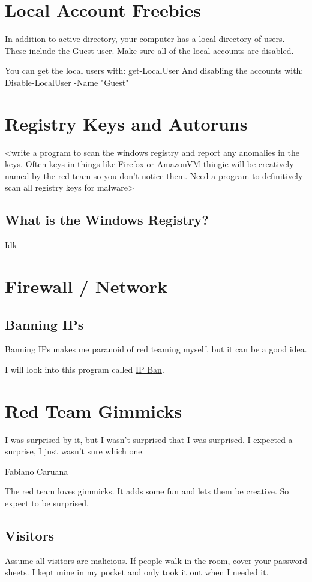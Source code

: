 \documentclass{article}
\begin{document}
\section{Local Account Freebies}
In addition to active directory, your computer has a local directory of users. These include the Guest user.
Make sure all of the local accounts are disabled.

You can get the local users with: get-LocalUser
And disabling the accounts with: Disable-LocalUser -Name "Guest"

\section{Registry Keys and Autoruns}
<write a program to scan the windows registry and report any anomalies in the keys.
Often keys in things like Firefox or AmazonVM thingie will be creatively named by the red team
so you don't notice them. Need a program to definitively scan all registry keys for malware>

\subsection{What is the Windows Registry?}
Idk

\section{Firewall / Network}

\subsection{Banning IPs}
Banning IPs makes me paranoid of red teaming myself, but it can be a good idea.

I will look into this program called \href{https://github.com/DigitalRuby/IPBan}{IP Ban}.

\section{Red Team Gimmicks}
\epigraph{I was surprised by it, but I wasn’t surprised that I was surprised. I expected a surprise, I just wasn’t sure which one.}{Fabiano Caruana}

The red team loves gimmicks. It adds some fun and lets them be creative. So expect to be surprised.

\subsection{Visitors}
Assume all visitors are malicious.
If people walk in the room, cover your password sheets. I kept mine in my pocket and only took it out when I needed it. 
\end{document}
